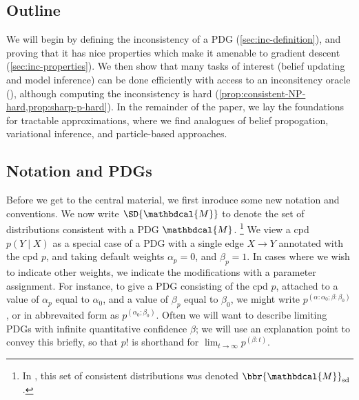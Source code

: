 \documentclass{article}
\theoremstyle{plain}
\theoremstyle{definition}
\theoremstyle{remark}
\newcommand{\dg}[1]{\mathbdcal{#1}}
\begin{document}



\subsection*{Outline}
We will begin by defining the inconsistency of a PDG (\cref{sec:inc-definition}), and proving that it has nice properties which make it amenable to gradient descent (\cref{sec:inc-properties}). We then show that many tasks of interest (belief updating and model inference) can be done efficiently with access to an inconsitency oracle (), although computing the inconsistency is hard (\cref{prop:consistent-NP-hard,prop:sharp-p-hard}).
In the remainder of the paper, we lay the foundations for tractable approximations, where we find analogues of belief propogation, variational inference, and particle-based approaches.


\subsection*{Notation and PDGs}


\begin{defn}
	
\end{defn}


Before we get to the central material, we first inroduce some new notation and conventions. We now write $\SD{\dg M}$ to denote
the set of distributions consistent with a PDG $\dg M$.%
	\footnote{In \cite{richardson2020probabilistic}, this set of consistent distributions was denoted $\bbr{\dg M}_{\textrm{sd}}$.}
We view a cpd $p(Y \mid X)$ as a special case of a PDG with
a single edge $X \to Y$ annotated with the cpd $p$, and taking
default weights $\alpha_p = 0$, and $\beta_p = 1$. In cases where we wish
to indicate other weights, we indicate the modifications with a parameter
assignment. For instance, to give a PDG consisting of the cpd $p$, attached to
a value of $\alpha_p$ equal to $\alpha_0$, and
a value of $\beta_p$ equal to $\beta_0$, we might write
$ p^{(\alpha:\alpha_0;\beta : \beta_0)} $, or in abbrevaited form as $p^{(\alpha_0;\beta_0)}$.
Often we will want to describe limiting PDGs with infinite quantitative confidence $\beta$; we will use an explanation point to convey this briefly, so that $p!$ is shorthand for
$\displaystyle\lim_{t \to \infty} p^{(\beta:t)}$.
%
\end{document}

